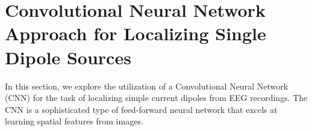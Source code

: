 \documentclass[a4paper, UKenglish, 11pt]{uiomaster}
\begin{document}
%
%
%
%
%

\section{Convolutional Neural Network Approach for Localizing Single Dipole Sources}

In this section, we explore the utilization of a Convolutional Neural Network (CNN) for the task of localizing simple current dipoles from EEG recordings. The CNN is a sophisticated type of feed-forward neural network that excels at learning spatial features from images.
\end{document}
